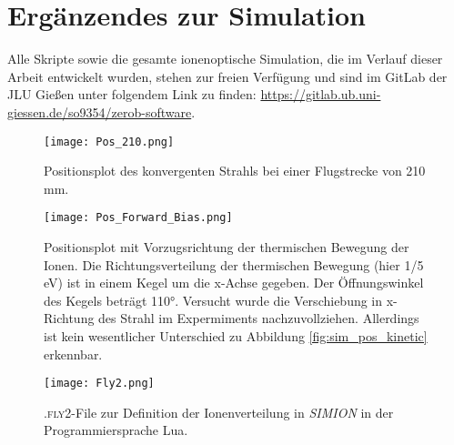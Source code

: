 \section{Ergänzendes zur Simulation}
Alle Skripte sowie die gesamte ionenoptische Simulation, die im Verlauf dieser Arbeit entwickelt wurden, stehen zur freien Verfügung und sind im GitLab der JLU Gießen unter folgendem Link zu finden: \url{https://gitlab.ub.uni-giessen.de/so9354/zerob-software}.



\begin{figure}[H]
    \centering
    \texttt{[image: Pos\_210.png]}
    \caption[Positionsplot des konvergenten Strahls]{Positionsplot des konvergenten Strahls bei einer Flugstrecke von 210 mm.}
    \label{fig:pos_210}
\end{figure}

\begin{figure}[H]
    \centering
    \texttt{[image: Pos\_Forward\_Bias.png]}
    \caption[Positionsplot mit Vorzugsrichtung der thermischen Bewegung]{Positionsplot mit Vorzugsrichtung der thermischen Bewegung der Ionen. Die Richtungsverteilung der thermischen Bewegung (hier 1/5 eV) ist in einem Kegel um die x-Achse gegeben. Der Öffnungswinkel des Kegels beträgt 110°. Versucht wurde die Verschiebung in x-Richtung des Strahl im Expermiments nachzuvollziehen. Allerdings ist kein wesentlicher Unterschied zu Abbildung \ref{fig:sim_pos_kinetic} erkennbar.}
    \label{fig:pos_bias}
\end{figure}   


\begin{figure}[H]
    \centering
    \texttt{[image: Fly2.png]}
    \caption[Ionenverteilung .fly2-File]{\textsc{.fly2}-File zur Definition der Ionenverteilung in \textit{SIMION} in der Programmiersprache Lua.}
    \label{fly2}
\end{figure}